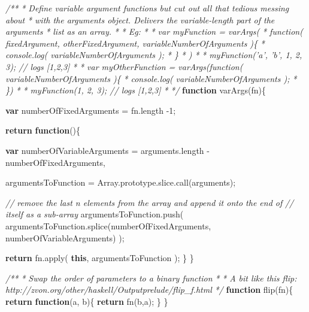 \documentclass[12pt, ]{article}
\newenvironment{Shaded}{}{}
\newcommand{\KeywordTok}[1]{\textcolor[rgb]{0.00,0.44,0.13}{\textbf{{#1}}}}
\newcommand{\DecValTok}[1]{\textcolor[rgb]{0.25,0.63,0.44}{{#1}}}
\newcommand{\CommentTok}[1]{\textcolor[rgb]{0.38,0.63,0.69}{\textit{{#1}}}}
\newcommand{\OtherTok}[1]{\textcolor[rgb]{0.00,0.44,0.13}{{#1}}}
\newcommand{\FunctionTok}[1]{\textcolor[rgb]{0.02,0.16,0.49}{{#1}}}
\newcommand{\NormalTok}[1]{{#1}}
\begin{document}
\begin{Shaded}
\begin{Highlighting}[]
\CommentTok{/**}
\CommentTok{ * Define variable argument functions but cut out all that tedious messing about }
\CommentTok{ * with the arguments object. Delivers the variable-length part of the arguments}
\CommentTok{ * list as an array.}
\CommentTok{ * }
\CommentTok{ * Eg:}
\CommentTok{ * }
\CommentTok{ * var myFunction = varArgs(}
\CommentTok{ *    function( fixedArgument, otherFixedArgument, variableNumberOfArguments )\{}
\CommentTok{ *       console.log( variableNumberOfArguments );}
\CommentTok{ *    \}}
\CommentTok{ * )}
\CommentTok{ * }
\CommentTok{ * myFunction('a', 'b', 1, 2, 3); // logs [1,2,3]}
\CommentTok{ * }
\CommentTok{ * var myOtherFunction = varArgs(function( variableNumberOfArguments )\{}
\CommentTok{ *    console.log( variableNumberOfArguments );}
\CommentTok{ * \})}
\CommentTok{ * }
\CommentTok{ * myFunction(1, 2, 3); // logs [1,2,3]}
\CommentTok{ * }
\CommentTok{ */}
\KeywordTok{function} \FunctionTok{varArgs}\NormalTok{(fn)\{}

   \KeywordTok{var} \NormalTok{numberOfFixedArguments = }\OtherTok{fn}\NormalTok{.}\FunctionTok{length} \NormalTok{-}\DecValTok{1}\NormalTok{;}
         
   \KeywordTok{return} \KeywordTok{function}\NormalTok{()\{}
   
      \KeywordTok{var} \NormalTok{numberOfVariableArguments = }\OtherTok{arguments}\NormalTok{.}\FunctionTok{length} \NormalTok{- numberOfFixedArguments,}
      
          \NormalTok{argumentsToFunction = }\OtherTok{Array}\NormalTok{.}\OtherTok{prototype}\NormalTok{.}\OtherTok{slice}\NormalTok{.}\FunctionTok{call}\NormalTok{(arguments);}
          
      \CommentTok{// remove the last n elements from the array and append it onto the end of}
      \CommentTok{// itself as a sub-array}
      \OtherTok{argumentsToFunction}\NormalTok{.}\FunctionTok{push}\NormalTok{( }
         \OtherTok{argumentsToFunction}\NormalTok{.}\FunctionTok{splice}\NormalTok{(numberOfFixedArguments, numberOfVariableArguments)}
      \NormalTok{);   }
      
      \KeywordTok{return} \OtherTok{fn}\NormalTok{.}\FunctionTok{apply}\NormalTok{( }\KeywordTok{this}\NormalTok{, argumentsToFunction );}
   \NormalTok{\}       }
\NormalTok{\}}


\CommentTok{/**}
\CommentTok{ * Swap the order of parameters to a binary function}
\CommentTok{ * }
\CommentTok{ * A bit like this flip: http://zvon.org/other/haskell/Outputprelude/flip_f.html}
\CommentTok{ */}
\KeywordTok{function} \FunctionTok{flip}\NormalTok{(fn)\{}
   \KeywordTok{return} \KeywordTok{function}\NormalTok{(a, b)\{}
      \KeywordTok{return} \FunctionTok{fn}\NormalTok{(b,a);}
   \NormalTok{\}}
\NormalTok{\}}



\end{Highlighting}
\end{Shaded}
\end{document}
